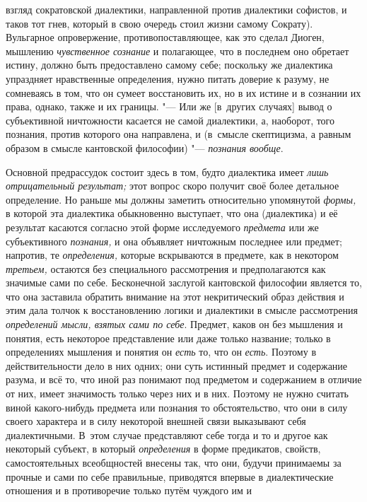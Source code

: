 взгляд сократовской диалектики, направленной против диалектики софистов, и
таков тот гнев, который в свою очередь стоил жизни самому Сократу).
Вульгарное опровержение, противопоставляющее, как это сделал Диоген,
мышлению {\em чувственное сознание}
и полагающее, что в последнем оно обретает истину, должно
быть предоставлено самому себе; поскольку же диалектика упраздняет
нравственные определения, нужно питать доверие к разуму, не сомневаясь в
том, что он сумеет восстановить их, но в их истине и в сознании их права,
однако, также и их границы. "--- Или же [в~других случаях]
вывод о субъективной ничтожности касается не самой диалектики, а, наоборот,
того познания, против которого она направлена, и (в~смысле скептицизма, а
равным образом в смысле кантовской философии) "--- {\em познания вообще}.

Основной предрассудок состоит здесь в том, будто диалектика
имеет {\em лишь отрицательный
результат;} этот вопрос скоро получит своё более детальное
определение. Но раньше мы должны заметить относительно упомянутой
{\em формы,} в которой
эта диалектика обыкновенно выступает, что она (диалектика) и её результат
касаются согласно этой форме исследуемого {\em предмета} или же
субъективного {\em познания,} и она объявляет ничтожным последнее или
предмет; напротив, те {\em определения,}
которые вскрываются в предмете, как в некотором {\em третьем,} остаются
без специального рассмотрения и предполагаются как значимые сами по себе.
\label{bkm:bm126a}Бесконечной заслугой кантовской философии
является то, что она заставила обратить внимание на этот некритический
образ действия и этим дала толчок к восстановлению логики и диалектики в
смысле рассмотрения {\em определений
мысли, взятых сами по себе}. Предмет, каков он без мышления
и понятия, есть некоторое представление или даже только название; только в
определениях мышления и понятия он {\em есть} то, что он {\em есть}. Поэтому
в действительности дело в них одних; они суть истинный предмет и содержание
разума, и всё то, что иной раз понимают под предметом и содержанием в
отличие от них, имеет значимость только через них и в них. Поэтому не нужно
считать виной какого-нибудь предмета или познания то обстоятельство, что
они в силу своего характера и в силу некоторой внешней связи выказывают
себя диалектичными. В~этом случае представляют себе тогда и то и другое как
некоторый субъект, в который {\em определения} в форме
предикатов, свойств, самостоятельных всеобщностей внесены так, что они,
будучи принимаемы за прочные и сами по себе правильные, приводятся впервые
в диалектические отношения и в противоречие только путём чуждого им и
